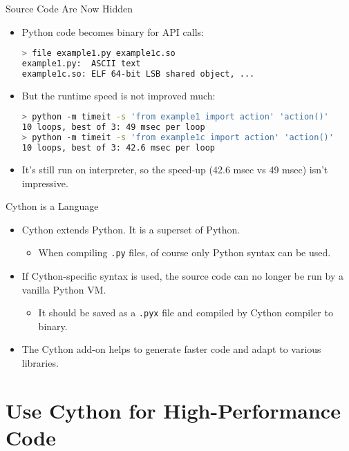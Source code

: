 \documentclass[dvips,xcolor=pst,14pt]{beamer}
\begin{document}
\begin{frame}[fragile]{
%
Source Code Are Now Hidden
%
}
\begin{itemize}
\item Python code becomes binary for API calls:
\begin{lstlisting}[language=bash]
> file example1.py example1c.so 
example1.py:  ASCII text
example1c.so: ELF 64-bit LSB shared object, ...
\end{lstlisting}
\item But the runtime speed is not improved much:
\begin{lstlisting}[language=bash]
> python -m timeit -s 'from example1 import action' 'action()'
10 loops, best of 3: 49 msec per loop
> python -m timeit -s 'from example1c import action' 'action()'
10 loops, best of 3: 42.6 msec per loop
\end{lstlisting}
\item It's still run on interpreter, so the speed-up (42.6 msec vs 49 msec)
isn't impressive.
\end{itemize}
\end{frame}

\begin{frame}[fragile]{
%
Cython is a Language
%
}
\begin{itemize}
\item Cython extends Python.  It is a \alert{superset} of Python.
\begin{itemize}
\item When compiling {\color{red}\verb+.py+} files, of course only Python
syntax can be used.
\end{itemize}
\item If Cython-specific syntax is used, the source code can no longer be run
by a vanilla Python VM.
\begin{itemize}
\item It should be saved as a {\color{red}\verb+.pyx+} file and compiled by
Cython compiler to binary.
\end{itemize}
\item The Cython add-on helps to generate faster code and adapt to various
libraries.
\end{itemize}
\end{frame}

\section{
Use Cython for High-Performance Code
}
\end{document}
